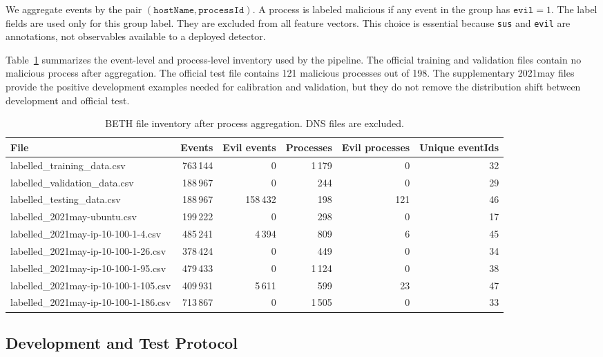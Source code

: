 \documentclass[10pt,journal,compsoc]{IEEEtran}
\begin{document}
We aggregate events by the pair $(\texttt{hostName}, \texttt{processId})$. A process is labeled malicious if any event in the group has $\texttt{evil}=1$. The label fields are used only for this group label. They are excluded from all feature vectors. This choice is essential because \texttt{sus} and \texttt{evil} are annotations, not observables available to a deployed detector.

Table~\ref{tab:file_inventory} summarizes the event-level and process-level inventory used by the pipeline. The official training and validation files contain no malicious process after aggregation. The official test file contains 121 malicious processes out of 198. The supplementary 2021may files provide the positive development examples needed for calibration and validation, but they do not remove the distribution shift between development and official test.

\begin{table}[t]
\centering
\caption{BETH file inventory after process aggregation. DNS files are excluded.}
\label{tab:file_inventory}
\begin{tabular}{lrrrrr}
\toprule
\textbf{File} & \textbf{Events} & \textbf{Evil events} & \textbf{Processes} & \textbf{Evil processes} & \textbf{Unique eventIds} \\
\midrule
labelled\_training\_data.csv & 763\,144 & 0 & 1\,179 & 0 & 32 \\
labelled\_validation\_data.csv & 188\,967 & 0 & 244 & 0 & 29 \\
labelled\_testing\_data.csv & 188\,967 & 158\,432 & 198 & 121 & 46 \\
labelled\_2021may-ubuntu.csv & 199\,222 & 0 & 298 & 0 & 17 \\
labelled\_2021may-ip-10-100-1-4.csv & 485\,241 & 4\,394 & 809 & 6 & 45 \\
labelled\_2021may-ip-10-100-1-26.csv & 378\,424 & 0 & 449 & 0 & 34 \\
labelled\_2021may-ip-10-100-1-95.csv & 479\,433 & 0 & 1\,124 & 0 & 38 \\
labelled\_2021may-ip-10-100-1-105.csv & 409\,931 & 5\,611 & 599 & 23 & 47 \\
labelled\_2021may-ip-10-100-1-186.csv & 713\,867 & 0 & 1\,505 & 0 & 33 \\
\bottomrule
\end{tabular}
\end{table}

\subsection{Development and Test Protocol}
\end{document}
